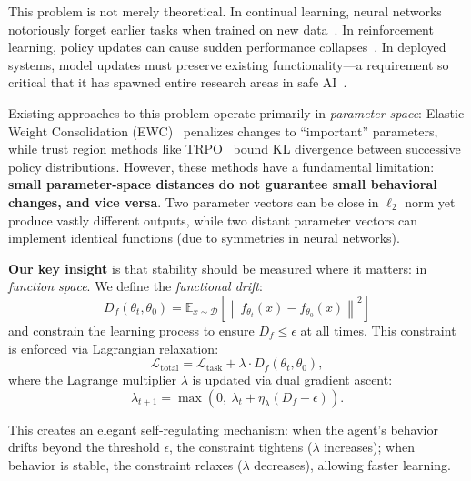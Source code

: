 \documentclass{article}
\newcommand{\E}{\mathbb{E}}
\newcommand{\norm}[1]{\left\|#1\right\|}
\newcommand{\Df}{D_f}
\newcommand{\calD}{\mathcal{D}}
\newcommand{\calL}{\mathcal{L}}
\begin{document}
This problem is not merely theoretical. In continual learning, neural networks notoriously forget earlier tasks when trained on new data~\citep{kirkpatrick2017overcoming}. In reinforcement learning, policy updates can cause sudden performance collapses~\citep{schulman2015trust}. In deployed systems, model updates must preserve existing functionality—a requirement so critical that it has spawned entire research areas in safe AI~\citep{amodei2016concrete}.

Existing approaches to this problem operate primarily in \emph{parameter space}: Elastic Weight Consolidation (EWC)~\citep{kirkpatrick2017overcoming} penalizes changes to ``important'' parameters, while trust region methods like TRPO~\citep{schulman2015trust} bound KL divergence between successive policy distributions. However, these methods have a fundamental limitation: \textbf{small parameter-space distances do not guarantee small behavioral changes, and vice versa}. Two parameter vectors can be close in $\ell_2$ norm yet produce vastly different outputs, while two distant parameter vectors can implement identical functions (due to symmetries in neural networks).

\textbf{Our key insight} is that stability should be measured where it matters: in \emph{function space}. We define the \emph{functional drift}:
\begin{equation}
\Df(\theta_t, \theta_0) = \E_{x \sim \calD}\left[\norm{f_{\theta_t}(x) - f_{\theta_0}(x)}^2\right]
\label{eq:drift_definition}
\end{equation}
and constrain the learning process to ensure $\Df \leq \epsilon$ at all times. This constraint is enforced via Lagrangian relaxation:
\begin{equation}
\calL_{\text{total}} = \calL_{\text{task}} + \lambda \cdot \Df(\theta_t, \theta_0),
\label{eq:lagrangian}
\end{equation}
where the Lagrange multiplier $\lambda$ is updated via dual gradient ascent:
\begin{equation}
\lambda_{t+1} = \max\left(0, \ \lambda_t + \eta_\lambda(\Df - \epsilon)\right).
\label{eq:dual_ascent}
\end{equation}

This creates an elegant self-regulating mechanism: when the agent's behavior drifts beyond the threshold $\epsilon$, the constraint tightens ($\lambda$ increases); when behavior is stable, the constraint relaxes ($\lambda$ decreases), allowing faster learning.
\end{document}
